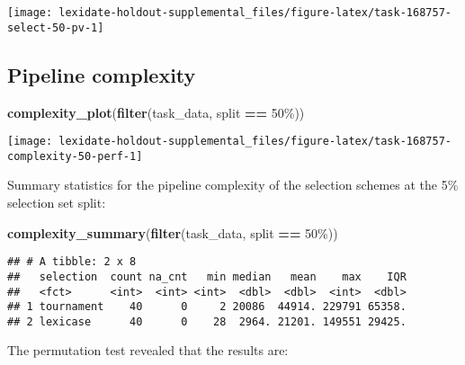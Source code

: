 \documentclass[
]{book}
\newenvironment{Shaded}{\begin{snugshade}}{\end{snugshade}}
\newcommand{\FunctionTok}[1]{\textcolor[rgb]{0.13,0.29,0.53}{\textbf{#1}}}
\newcommand{\NormalTok}[1]{#1}
\newcommand{\SpecialCharTok}[1]{\textcolor[rgb]{0.81,0.36,0.00}{\textbf{#1}}}
\newcommand{\StringTok}[1]{\textcolor[rgb]{0.31,0.60,0.02}{#1}}
\begin{document}
\texttt{[image: lexidate-holdout-supplemental\_files/figure-latex/task-168757-select-50-pv-1]}

\hypertarget{pipeline-complexity-21}{%
\subsection{Pipeline complexity}\label{pipeline-complexity-21}}

\begin{Shaded}
\begin{Highlighting}[]
\FunctionTok{complexity\_plot}\NormalTok{(}\FunctionTok{filter}\NormalTok{(task\_data, split }\SpecialCharTok{==} \StringTok{\textquotesingle{}50\%\textquotesingle{}}\NormalTok{))}
\end{Highlighting}
\end{Shaded}

\texttt{[image: lexidate-holdout-supplemental\_files/figure-latex/task-168757-complexity-50-perf-1]}

Summary statistics for the pipeline complexity of the selection schemes at the 5\% selection set split:

\begin{Shaded}
\begin{Highlighting}[]
\FunctionTok{complexity\_summary}\NormalTok{(}\FunctionTok{filter}\NormalTok{(task\_data, split }\SpecialCharTok{==} \StringTok{\textquotesingle{}50\%\textquotesingle{}}\NormalTok{))}
\end{Highlighting}
\end{Shaded}

\begin{verbatim}
## # A tibble: 2 x 8
##   selection  count na_cnt   min median   mean    max    IQR
##   <fct>      <int>  <int> <int>  <dbl>  <dbl>  <int>  <dbl>
## 1 tournament    40      0     2 20086  44914. 229791 65358.
## 2 lexicase      40      0    28  2964. 21201. 149551 29425.
\end{verbatim}

The permutation test revealed that the results are:
\end{document}
